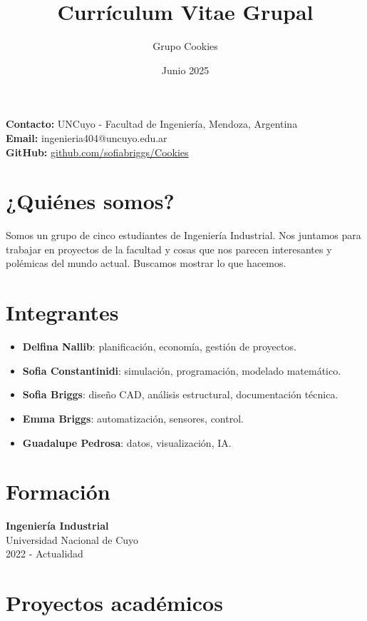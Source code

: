 \documentclass[a4paper,11pt]{article}
\title{\textbf{Currículum Vitae Grupal}}
\author{Grupo Cookies}
\date{Junio 2025}
\begin{document}
\maketitle

\noindent\textbf{Contacto:} UNCuyo - Facultad de Ingeniería, Mendoza, Argentina\\
\textbf{Email:} ingenieria404@uncuyo.edu.ar\\
\textbf{GitHub:} \href{https://github.com/sofiabriggs/Cookies}{github.com/sofiabriggs/Cookies}

\vspace{0.5cm}
\section*{¿Quiénes somos?}
Somos un grupo de cinco estudiantes de Ingeniería Industrial. Nos juntamos para trabajar en proyectos de la facultad y cosas que nos parecen interesantes y polémicas del mundo actual. Buscamos mostrar lo que hacemos.

\section*{Integrantes}

\begin{itemize}[leftmargin=*]
  \item \textbf{Delfina Nallib}: planificación, economía, gestión de proyectos.
  \item \textbf{Sofia Constantinidi}: simulación, programación, modelado matemático.
  \item \textbf{Sofia Briggs}: diseño CAD, análisis estructural, documentación técnica.
  \item \textbf{Emma Briggs}: automatización, sensores, control.
  \item \textbf{Guadalupe Pedrosa}: datos, visualización, IA.
\end{itemize}

\section*{Formación}
\textbf{Ingeniería Industrial} \\
Universidad Nacional de Cuyo \\
2022 - Actualidad

\section*{Proyectos académicos}
\end{document}
